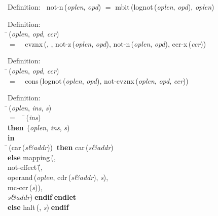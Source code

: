 \begin{tabbing}{\sc Definition}:$\;\;$
{\rm{not-n}}\,({\it{oplen\/}}, {\it{opd\/}}) $=$ {\rm{mbit}}\,({\rm{lognot}}\,({\it{oplen\/}}, {\it{opd\/}}), {\it{oplen\/}})
\end{tabbing}

\begin{tabbing}{\sc Definition}: \\  
\=\,({\it{oplen\/}}, {\it{opd\/}}, {\it{ccr\/}}) \\ 
$=$$\;\;\;\;${\rm{cvznx}}\,({}, {}, {\rm{not-z}}\,({\it{oplen\/}}, {\it{opd\/}}), {\rm{not-n}}\,({\it{oplen\/}}, {\it{opd\/}}), {\rm{ccr-x}}\,({\it{ccr\/}}))\-
\end{tabbing}

\begin{tabbing}{\sc Definition}: \\  
\=\,({\it{oplen\/}}, {\it{opd\/}}, {\it{ccr\/}}) \\ 
$=$$\;\;\;\;${\rm{cons}}\,({\rm{lognot}}\,({\it{oplen\/}}, {\it{opd\/}}), {\rm{not-cvznx}}\,({\it{oplen\/}}, {\it{opd\/}}, {\it{ccr\/}}))\-
\end{tabbing}

\begin{tabbing}{\sc Definition}: \\  
\=\,({\it{oplen\/}}, {\it{ins\/}}, {\it{s\/}}) \\ 
$=$$\;\;\;\;$\=\,({\it{ins\/}}) \\ 
{\bf then }\=\=\,({\it{oplen\/}}, {\it{ins\/}}, {\it{s\/}})\- \\ 
{\bf in} \\ 
\=\,({\rm{car}}\,({\it{s\&addr\/}}))$\;\;${\bf then }{\rm{car}}\,({\it{s\&addr\/}}) \\ 
{\bf else }{\rm{mapping}}\,(\=, \\ 
{\rm{not-effect}}\,(\=, \\ 
{\rm{operand}}\,({\it{oplen\/}}, {\rm{cdr}}\,({\it{s\&addr\/}}), {\it{s\/}}), \\ 
{\rm{mc-ccr}}\,({\it{s\/}}))\-, \\ 
{\it{s\&addr\/}})\-$\;${\bf  endif}\-$\;${\bf  endlet}\- \\ 
{\bf else }{\rm{halt}}\,({}, {\it{s\/}})$\;${\bf  endif}\-\-
\end{tabbing}

